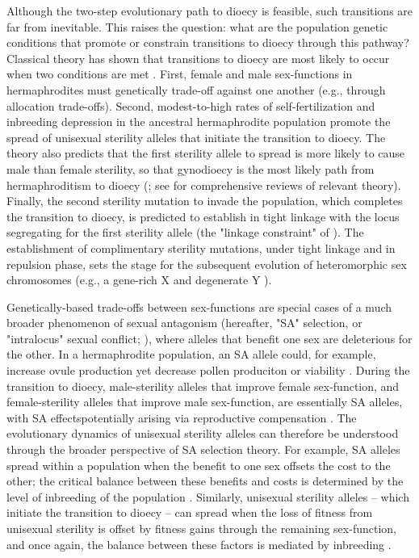 \documentclass{article}
\begin{document}
Although the two-step evolutionary path to dioecy is feasible, such transitions are far from inevitable. This raises the question: what are the population genetic conditions that promote or constrain transitions to dioecy through this pathway? Classical theory has shown that transitions to dioecy are most likely to occur when two conditions are met \citep{Lewis1941, Lloyd1975, Lloyd1976, Charlesworth1978a}. First, female and male sex-functions in hermaphrodites must genetically trade-off against one another (e.g., through allocation trade-offs). Second, modest-to-high rates of self-fertilization and inbreeding depression in the ancestral hermaphrodite population promote the spread of unisexual sterility alleles that initiate the transition to dioecy. The theory also predicts that the first sterility allele to spread is more likely to cause male than female sterility, so that gynodioecy is the most likely path from hermaphroditism to dioecy (\citealt{Lloyd1975, Charlesworth1978a, KaferPannell2017}; see \citealt{Charlesworth1999, Charlesworth2006} for comprehensive reviews of relevant theory). Finally, the second sterility mutation to invade the population, which completes the transition to dioecy, is predicted to establish in tight linkage with the locus segregating for the first sterility allele (the "linkage constraint" of \citealt{Charlesworth1978a}). The establishment of complimentary sterility mutations, under tight linkage and in repulsion phase, sets the stage for the subsequent evolution of heteromorphic sex chromosomes (e.g., a gene-rich X and degenerate Y \citealt{Rice1987, Bachtrog2006, Charlesworth2002, Qiuetal2013}). 

Genetically-based trade-offs between sex-functions are special cases of a much broader phenomenon of sexual antagonism (hereafter, "SA" selection, or "intralocus" sexual conflict; \citealt{Rice1992,BondurianskyChenoweth2009, Mank2017}), where alleles that benefit one sex are deleterious for the other. In a hermaphrodite population, an SA allele could, for example, increase ovule production yet decrease pollen produciton or viability \citep{JordanConnallon2014, Olito2016}. During the transition to dioecy, male-sterility alleles that improve female sex-function, and female-sterility alleles that improve male sex-function, are essentially SA alleles, with SA effectspotentially arising via reproductive compensation \citep{Lewis1941, Lloyd1975, Charlesworth1978a}. The evolutionary dynamics of unisexual sterility alleles can therefore be understood through the broader perspective of SA selection theory. For example, SA alleles spread within a population when the benefit to one sex offsets the cost to the other; the critical balance between these benefits and costs is determined by the level of inbreeding of the population \citep{Kidwell1977, JordanConnallon2014}. Similarly, unisexual sterility alleles -- which initiate the transition to dioecy -- can spread when the loss of fitness from unisexual sterility is offset by fitness gains through the remaining sex-function, and once again, the balance between these factors is mediated by inbreeding \citep{Charlesworth1978a}. 
\end{document}
